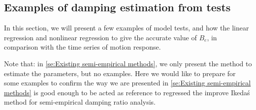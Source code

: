 \subsection{Examples of damping estimation from tests}
\label{examples_damping_reference_fromdatabase}
In this section, we will present a few examples of model tests, and how the linear regression and nonlinear regression to give the accurate value of $B_e$, in comparison with the time series of motion response.

Note that: in \ref{se:Existing semi-empirical methods}, we only present the method to estimate the parameters, but no examples. Here we would like to prepare for some examples to confirm the way we are presented in \ref{se:Existing semi-empirical methods} is good enough to be acted as reference to regressed the improve Ikeda\'s method for semi-empirical damping ratio analysis.